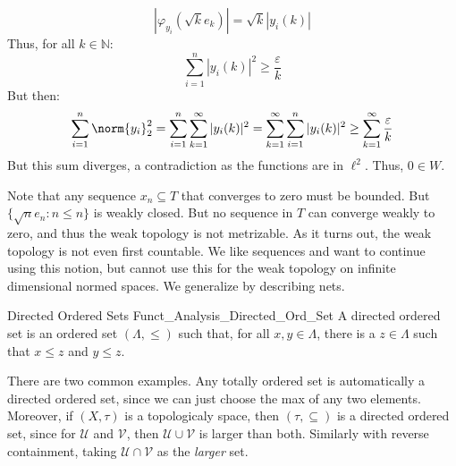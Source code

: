 \documentclass[crop=false,class=book,oneside]{standalone}                      %
\begin{document}
\begin{lexample}
            \begin{equation}
                |\varphi_{y_{i}}(\sqrt{k}e_{k})|=
                \sqrt{k}|y_{i}(k)|
            \end{equation}
            Thus, for all $k\in\mathbb{N}$:
            \begin{equation}
                \sum_{i=1}^{n}|y_{i}(k)|^{2}\geq
                \frac{\varepsilon}{k}
            \end{equation}
            But then:
            \begin{equation}
                \sum_{i=1}^{n}\norm{y_{i}}_{2}^{2}
                =\sum_{i=1}^{n}\sum_{k=1}^{\infty}
                    |y_{i}(k)|^{2}
                =\sum_{k=1}^{\infty}\sum_{i=1}^{n}
                    |y_{i}(k)|^{2}\geq\sum_{k=1}^{\infty}
                        \frac{\varepsilon}{k}
            \end{equation}
            But this sum diverges, a contradiction as the functions
            are in $\ell^{2}$. Thus, $0\in{W}$.
        \end{lexample}
        Note that any sequence $x_{n}\subseteq{T}$ that converges
        to zero must be bounded. But $\{\sqrt{n}e_{n}:n\leq{n}\}$
        is weakly closed. But no sequence in $T$ can converge weakly
        to zero, and thus the weak topology is not metrizable.
        As it turns out, the weak topology is not even
        first countable. We like sequences and want to continue
        using this notion, but cannot use this for the weak
        topology on infinite dimensional normed spaces. We
        generalize by describing nets.
        \begin{ldefinition}{Directed Ordered Sets}
              {Funct_Analysis_Directed_Ord_Set}
            A directed ordered set is an ordered set
            $(\Lambda,\leq)$ such that, for all $x,y\in\Lambda$,
            there is a $z\in\Lambda$ such that
            $x\leq{z}$ and $y\leq{z}$.
        \end{ldefinition}
        \begin{lexample}
            There are two common examples. Any totally ordered
            set is automatically a directed ordered set,
            since we can just choose the max of any two elements.
            Moreover, if $(X,\tau)$ is a topologicaly space, then
            $(\tau,\subseteq)$ is a directed ordered set, since
            for $\mathcal{U}$ and $\mathcal{V}$, then
            $\mathcal{U}\cup\mathcal{V}$ is larger than both.
            Similarly with reverse containment, taking
            $\mathcal{U}\cap\mathcal{V}$ as the
            \textit{larger} set.
        \end{lexample}
\end{document}
